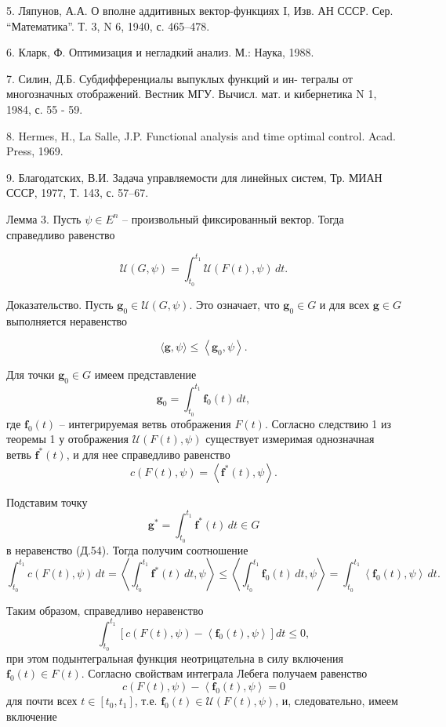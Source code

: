 \documentclass[8pt]{extarticle}
\begin{document}
5. Ляпунов, А.А. О вполне аддитивных вектор-функциях I, Изв. АН СССР. Сер. ``Математика''. Т. 3, N 6, 1940, с. 465--478.

6. Кларк, Ф. Оптимизация и негладкий анализ. М.: Наука, 1988.

7. Силин, Д.Б. Субдифференциалы выпуклых функций и ин- тегралы от многозначных отображений. Вестник МГУ. Вычисл. мат. и кибернетика N 1, 1984, с. 55 - 59.

8. Hermes, H., La Salle, J.P. Functional analysis and time optimal control. Acad. Press, 1969.

9. Благодатских, В.И. Задача управляемости для линейных систем, Тр. МИАН СССР, 1977, Т. 143, с. 57--67.

\fi

Лемма 3. Пусть \(\psi \in {E}^{n}\) -- произвольный фиксированный вектор. Тогда справедливо равенство

\[
\mathcal{U}\left( G,\psi \right) = \int_{t_0}^{t_1}\mathcal{U}\left( F(t),\psi \right)\,dt. \tag{Д.53}
\]

Доказательство. Пусть \(\mathbf{g}_0 \in \mathcal{U}\left( G,\psi \right)\). Это означает, что \(\mathbf{g}_0 \in G\) и для всех \(\mathbf{g} \in G\) выполняется неравенство

\[
\langle \mathbf{g},\psi \rangle \leq \left\langle \mathbf{g}_0,\psi \right\rangle . \tag{Д.54}
\]

Для точки \(\mathbf{g}_0 \in G\) имеем представление
\[
\mathbf{g}_0 = \int_{t_0}^{t_1}\mathbf{f}_0(t)\,dt,
\]
где \(\mathbf{f}_0(t)\) -- интегрируемая ветвь отображения \(F(t)\). Согласно следствию 1 из теоремы 1 у отображения \(\mathcal{U}\left( F(t),\psi \right)\) существует измеримая однозначная ветвь \(\mathbf{f}^{*}(t)\), и для нее справедливо равенство
\[
c\left( F(t),\psi \right) = \left\langle \mathbf{f}^{*}(t),\psi \right\rangle .
\]

Подставим точку
\[
\mathbf{g}^{*} = \int_{t_0}^{t_1}\mathbf{f}^{*}(t)\,dt \in G
\]
в неравенство (Д.54). Тогда получим соотношение
\[
\int_{t_0}^{t_1} c\left( F(t),\psi \right)\,dt
= \left\langle \int_{t_0}^{t_1}\mathbf{f}^{*}(t)\,dt,\psi \right\rangle
\leq \left\langle \int_{t_0}^{t_1}\mathbf{f}_0(t)\,dt,\psi \right\rangle
= \int_{t_0}^{t_1}\left\langle \mathbf{f}_0(t),\psi \right\rangle \,dt.
\]

Таким образом, справедливо неравенство
\[
\int_{t_0}^{t_1}\left[ c\left( F(t),\psi \right) - \left\langle \mathbf{f}_0(t),\psi \right\rangle \right] dt \leq 0,
\]
при этом подынтегральная функция неотрицательна в силу включения \(\mathbf{f}_0(t) \in F(t)\). Согласно свойствам интеграла Лебега получаем равенство
\[
c\left( F(t),\psi \right) - \left\langle \mathbf{f}_0(t),\psi \right\rangle = 0 \tag{Д.55}
\]
для почти всех \(t \in [t_0,t_1]\), т.е. \(\mathbf{f}_0(t) \in \mathcal{U}\left( F(t),\psi \right)\), и, следовательно, имеем включение
\end{document}
